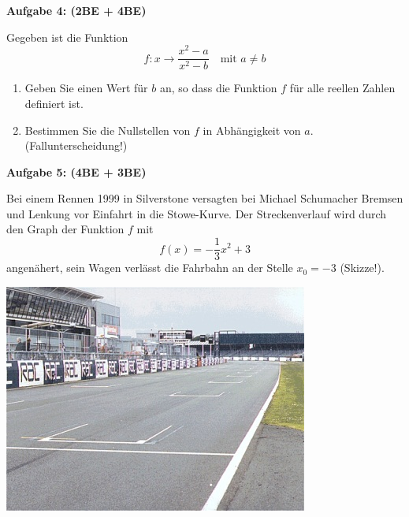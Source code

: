 \documentclass[a4paper,12pt]{article}
\newcommand{\Aufgabe}[1]{
  {
  \vspace*{0.5cm}
  \textsf{\textbf{Aufgabe #1}}
  \vspace*{0.2cm}
  
  }
}
\begin{document}


\newpage
\enlargethispage{4cm}
\Aufgabe{4: (2BE + 4BE)}
Gegeben ist die Funktion 
\[f:x \rightarrow \frac{x^2-a}{x^2-b} \quad \text{mit $a\neq b$}\]

\begin{enumerate}[label={\alph*)}]
  \item Geben Sie einen Wert für $b$ an, so dass die Funktion $f$ für alle reellen Zahlen definiert ist.
  \item Bestimmen Sie die Nullstellen von $f$ in Abhängigkeit von $a$. (Fallunterscheidung!)
\end{enumerate}

\Aufgabe{5: (4BE + 3BE)}
\noindent
\begin{minipage}{0.6\textwidth}%
Bei einem Rennen 1999 in Silverstone versagten bei Michael Schumacher Bremsen und Lenkung vor Einfahrt in die Stowe-Kurve. Der Streckenverlauf wird durch den Graph der Funktion $f$ mit
\[f(x)=-\frac{1}{3}x^2+3 \]
  angenähert, sein Wagen verlässt die Fahrbahn an der Stelle $x_0 = -3$ (Skizze!).
\end{minipage}
\hfill%
\begin{minipage}{0.3\textwidth}%
\includegraphics[width=\linewidth]{Q11_1KlausurJanuar2022_3.png}
\end{minipage}%
\end{document}
